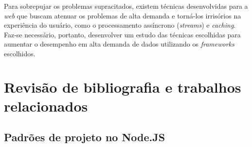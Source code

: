 \documentclass[12pt]{article}
\begin{document}
Para sobrepujar os problemas supracitados, existem técnicas desenvolvidas para a \textit{web} que buscam
atenuar os problemas de alta demanda e torná-los irrisórios na experiência do usuário, como o processamento
assíncrono (\textit{streams}) e \textit{caching}. Faz-se necessário, portanto, desenvolver um estudo das 
técnicas escolhidas para aumentar o desempenho em alta demanda de dados utilizando os \textit{frameworks} 
escolhidos.







\section{Revisão de bibliografia e trabalhos relacionados}

\subsection{Padrões de projeto no Node.JS}
\end{document}
